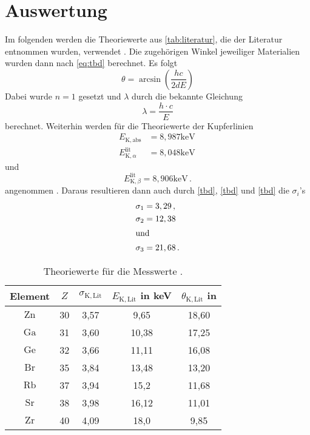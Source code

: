 \section{Auswertung}
\label{sec:Auswertung}


Im folgenden werden die Theoriewerte aus \autoref{tab:literatur}, die der Literatur entnommen wurden, verwendet \cite{x_ray_database}.
Die zugehörigen Winkel jeweiliger Materialien wurden dann nach \autoref{eq:tbd} berechnet.
Es folgt 
\begin{equation*}
  \theta = \arcsin \left( \frac{h c}{2 d E} \right)
\end{equation*}
Dabei wurde $n = 1$ gesetzt und $\lambda$ durch die bekannte Gleichung 
\begin{equation*}
  \lambda = \frac{h \cdot c}{E}
\end{equation*}
berechnet.
Weiterhin werden für die Theoriewerte der Kupferlinien
\begin{align*}
  E_{\mathrm{K}, \mathrm{abs}} &=8,987 \mathrm{keV} \, \\
  E_{\mathrm{K}, \alpha}^{\mathrm{lit}} &=8,048 \mathrm{keV} 
\end{align*}
und
\begin{equation*}
  E_{\mathrm{K}, \beta}^{\mathrm{lit}} =8,906 \mathrm{keV} \, .
\end{equation*}
angenommen \cite{x_ray_database}.
Daraus resultieren dann auch durch \autoref{tbd}, \autoref{tbd} und \autoref{tbd} die $\sigma_i$'s
\begin{align*}
  \sigma_{1} &=3,29 \, ,\\
  \sigma_{2} &=12,38 \\ 
  \intertext{und}
  \sigma_{3} &=21,68 \, .
\end{align*}

 
\begin{table}
  \centering
  \caption{Theoriewerte für die Messwerte \cite{x_ray_database}.}
  \label{tab:literatur}
  \begin{tabular}{ccccc} 
    \hline Element & $Z$ & $\sigma_{\mathrm{K, Lit}}$& $E_{\mathrm{K, Lit}}$ in keV & $\theta_{\mathrm{K, Lit}}$ in \\
    \hline $\mathrm{Zn}$ & 30 & 3,57 & 9,65 & 18,60  \\
    $\mathrm{Ga}$ & 31 & 3,60 & 10,38 & 17,25  \\
    $\mathrm{Ge}$ & 32 & 3,66 & 11,11 & 16,08  \\
    $\mathrm{Br}$ & 35 & 3,84 & 13,48 & 13,20  \\
    $\mathrm{Rb}$ & 37 & 3,94 & 15,2 & 11,68   \\
    $\mathrm{Sr}$ & 38 & 3,98 & 16,12 & 11,01  \\
    $\mathrm{Zr}$ & 40 & 4,09 & 18,0 & 9,85    \\
    \hline
  \end{tabular}
\end{table}

